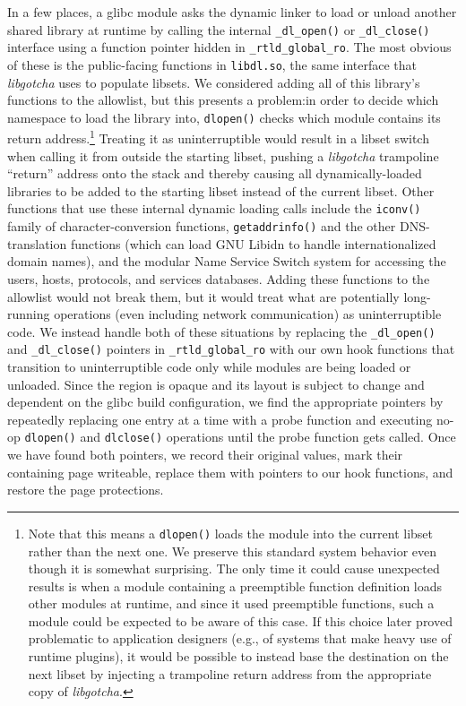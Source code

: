 In a few places, a glibc module asks the dynamic linker to load or unload another
shared library at runtime by calling the internal \texttt{\_dl\_open()} or
\texttt{\_dl\_close()} interface using a function pointer hidden in
\texttt{\_rtld\_global\_ro}.  The most obvious of these is the public-facing
functions in \texttt{libdl.so}, the same interface that \textit{libgotcha} uses to
populate libsets.  We considered adding all of this library's functions to the
allowlist, but this presents a problem:\@ in order to decide which namespace to load
the library into, \texttt{dlopen()} checks which module contains its return
address.\footnote{Note that this means a \texttt{dlopen()} loads the module into the
current libset rather than the next one.  We preserve this standard system behavior
even though it is somewhat surprising.  The only time it could cause unexpected
results is when a module containing a preemptible function definition loads other
modules at runtime, and since it used preemptible functions, such a module could be
expected to be aware of this case.  If this choice later proved problematic to
application designers (e.g., of systems that make heavy use of runtime plugins), it
would be possible to instead base the destination on the next libset by injecting a
trampoline return address from the appropriate copy of \textit{libgotcha}.}
Treating it as uninterruptible would result in a libset switch when calling it from
outside the starting libset, pushing a \textit{libgotcha} trampoline ``return''
address onto the stack and thereby causing all dynamically-loaded libraries to be
added to the starting libset instead of the current libset.  Other functions that
use these internal dynamic loading calls include the \texttt{iconv()} family of
character-conversion functions, \texttt{getaddrinfo()} and the other DNS-translation
functions (which can load GNU Libidn to handle internationalized domain names), and
the modular Name Service Switch system for accessing the users, hosts, protocols,
and services databases.  Adding these functions to the allowlist would not break
them, but it would treat what are potentially long-running operations (even including
network communication) as uninterruptible code.  We instead handle both of these
situations by
replacing the \texttt{\_dl\_open()} and \texttt{\_dl\_close()} pointers in
\texttt{\_rtld\_global\_ro} with our own hook functions that transition to
uninterruptible code only while modules are being loaded or unloaded.  Since the
region is opaque and its layout is subject to change and dependent on the glibc build
configuration, we find the appropriate
pointers by repeatedly replacing one entry at a time with a probe function and
executing no-op
\texttt{dlopen()} and \texttt{dlclose()} operations until the probe function gets
called.  Once we have found both pointers, we record their original values, mark
their containing page writeable, replace them with pointers to our hook functions,
and restore the page protections.
\\


